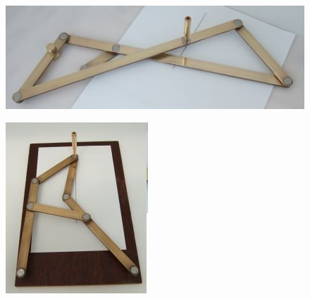 \begin{figure}[h!]
	\begin{center}
		\includegraphics[width=1\linewidth]{chapters/chapter22/images/5}
		\caption{}
		\label{ris:image22x5}
	\end{center}
\end{figure}	
\clearpage
\begin{figure}[h!]
	\begin{center}
		\includegraphics[width=1\linewidth]{chapters/chapter22/images/6}
		\caption{}
		\label{ris:image22x6}
	\end{center}
\end{figure}	
\clearpage
